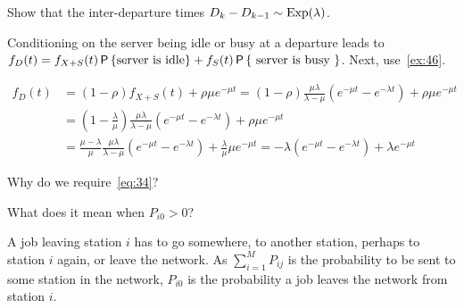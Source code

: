 \begin{exercise}\label{ex:63}
Show that the inter-departure times $D_k -D_{k-1} \sim \Exp{\lambda}$.
\begin{hint}
Conditioning on the server being idle or busy at a departure leads to
$f_D(t) = f_{X+S}(t) \P{\text{server is idle}} + f_S(t) \P{\text{ server is busy }}$.
Next, use~\cref{ex:46}.
\end{hint}
\begin{solution}
 \begin{align*}
 f_D(t)
&= (1-\rho) f_{X+S}(t) + \rho \mu e^{-\mu t}
= (1-\rho) \frac{\mu\lambda}{\lambda-\mu} \left(e^{-\mu t}-e^{-\lambda t}\right) + \rho \mu e^{-\mu t} \\
&= \left(1-\frac{\lambda}\mu\right) \frac{\mu\lambda}{\lambda-\mu}\left(e^{-\mu t}-e^{-\lambda t}\right) + \rho \mu e^{-\mu t} \\
&= \frac{\mu-\lambda}\mu \frac{\mu\lambda}{\lambda-\mu}\left(e^{-\mu t}-e^{-\lambda t}\right) + \frac\lambda \mu \mu e^{-\mu t}
= - \lambda\left(e^{-\mu t}-e^{-\lambda t}\right) + \lambda e^{-\mu t}
 \end{align*}
\end{solution}
\end{exercise}


\begin{exercise}\label{ex:on:3}
  Why do we require~\cref{eq:34}?
\begin{hint}
 What does it mean when $P_{i 0 } > 0$?
\end{hint}
\begin{solution}
  A job leaving station $i$ has to go somewhere, to another station, perhaps to station $i$ again, or leave the network.
  As $\sum_{i=1}^MP_{i j}$ is the probability to be sent to some station in the network, $P_{i 0} $ is the probability a job leaves the network from station $i$.
\end{solution}
\end{exercise}


